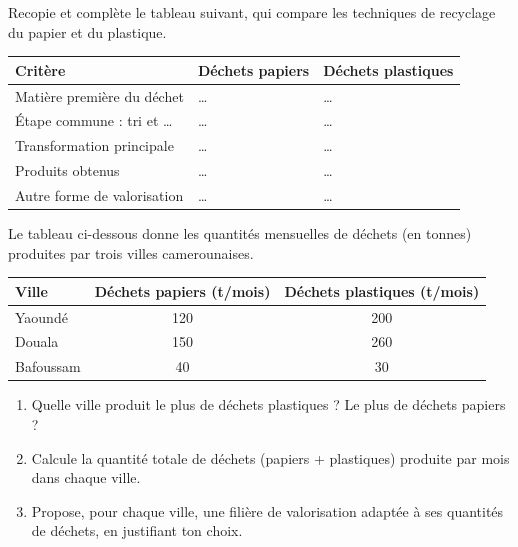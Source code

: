 \documentclass[11pt]{article}
\begin{document}
\begin{exercice}
Recopie et complète le tableau suivant, qui compare les techniques de recyclage du papier et du plastique.
\begin{center}
\begin{tabularx}{\linewidth}{|l|X|X|}
\hline
\rowcolor{popblueL} \textbf{Critère} & \textbf{Déchets papiers} & \textbf{Déchets plastiques} \\
\hline
Matière première du déchet & \ldots & \ldots \\
\hline
Étape commune : tri et \ldots & \ldots & \ldots \\
\hline
Transformation principale & \ldots & \ldots \\
\hline
Produits obtenus & \ldots & \ldots \\
\hline
Autre forme de valorisation & \ldots & \ldots \\
\hline
\end{tabularx}
\end{center}
\end{exercice}

\begin{exercice}
Le tableau ci-dessous donne les quantités mensuelles de déchets (en tonnes) produites par trois villes camerounaises.
\begin{center}
\begin{tabular}{|l|c|c|}
\hline
\rowcolor{popblueL} \textbf{Ville} & \textbf{Déchets papiers (t/mois)} & \textbf{Déchets plastiques (t/mois)} \\
\hline
Yaoundé & 120 & 200 \\
\hline
Douala & 150 & 260 \\
\hline
Bafoussam & 40 & 30 \\
\hline
\end{tabular}
\end{center}
\begin{enumerate}
\item Quelle ville produit le plus de déchets plastiques ? Le plus de déchets papiers ?
\item Calcule la quantité totale de déchets (papiers + plastiques) produite par mois dans chaque ville.
\item Propose, pour chaque ville, une filière de valorisation adaptée à ses quantités de déchets, en justifiant ton choix.
\end{enumerate}
\end{exercice}
\end{document}
